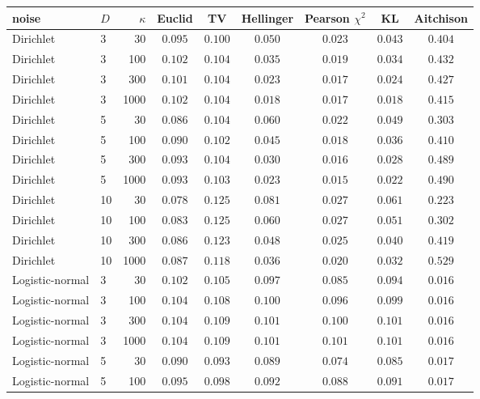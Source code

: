 \begin{tabular}{llrcccccc}\toprule
noise & $D$ & $\kappa$ & Euclid & TV & Hellinger & Pearson $\chi^2$ & KL & Aitchison\\\midrule
Dirichlet & 3 & 30 & $0.095$ & $0.100$ & $0.050$ & $\mathbf{0.023}$ & $0.043$ & $0.404$\\
Dirichlet & 3 & 100 & $0.102$ & $0.104$ & $0.035$ & $\mathbf{0.019}$ & $0.034$ & $0.432$\\
Dirichlet & 3 & 300 & $0.101$ & $0.104$ & $0.023$ & $\mathbf{0.017}$ & $0.024$ & $0.427$\\
Dirichlet & 3 & 1000 & $0.102$ & $0.104$ & $\mathbf{0.018}$ & $\mathbf{0.017}$ & $\mathbf{0.018}$ & $0.415$\\
Dirichlet & 5 & 30 & $0.086$ & $0.104$ & $0.060$ & $\mathbf{0.022}$ & $0.049$ & $0.303$\\
Dirichlet & 5 & 100 & $0.090$ & $0.102$ & $0.045$ & $\mathbf{0.018}$ & $0.036$ & $0.410$\\
Dirichlet & 5 & 300 & $0.093$ & $0.104$ & $0.030$ & $\mathbf{0.016}$ & $0.028$ & $0.489$\\
Dirichlet & 5 & 1000 & $0.093$ & $0.103$ & $0.023$ & $\mathbf{0.015}$ & $0.022$ & $0.490$\\
Dirichlet & 10 & 30 & $0.078$ & $0.125$ & $0.081$ & $\mathbf{0.027}$ & $0.061$ & $0.223$\\
Dirichlet & 10 & 100 & $0.083$ & $0.125$ & $0.060$ & $\mathbf{0.027}$ & $0.051$ & $0.302$\\
Dirichlet & 10 & 300 & $0.086$ & $0.123$ & $0.048$ & $\mathbf{0.025}$ & $0.040$ & $0.419$\\
Dirichlet & 10 & 1000 & $0.087$ & $0.118$ & $0.036$ & $\mathbf{0.020}$ & $0.032$ & $0.529$\\
Logistic-normal & 3 & 30 & $0.102$ & $0.105$ & $0.097$ & $0.085$ & $0.094$ & $\mathbf{0.016}$\\
Logistic-normal & 3 & 100 & $0.104$ & $0.108$ & $0.100$ & $0.096$ & $0.099$ & $\mathbf{0.016}$\\
Logistic-normal & 3 & 300 & $0.104$ & $0.109$ & $0.101$ & $0.100$ & $0.101$ & $\mathbf{0.016}$\\
Logistic-normal & 3 & 1000 & $0.104$ & $0.109$ & $0.101$ & $0.101$ & $0.101$ & $\mathbf{0.016}$\\
Logistic-normal & 5 & 30 & $0.090$ & $0.093$ & $0.089$ & $0.074$ & $0.085$ & $\mathbf{0.017}$\\
Logistic-normal & 5 & 100 & $0.095$ & $0.098$ & $0.092$ & $0.088$ & $0.091$ & $\mathbf{0.017}$\\

\end{tabular}
